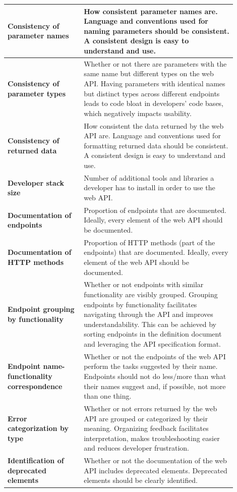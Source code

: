 \documentclass[12pt]{article}
\begin{document}
\begin{center}
{\begin{longtable}{p{0.3\linewidth}p{0.6\linewidth}}
			\hline
			\textbf{Consistency of parameter names} & How consistent parameter names are. Language and conventions used for naming parameters should be consistent. A consistent design is easy to understand and use.\\
			\hline
			\textbf{Consistency of parameter types} & Whether or not there are parameters with the same name but different types on the web API. Having parameters with identical names but distinct types across different endpoints leads to code bloat in developers' code bases, which negatively impacts usability.\\
			\hline
			\textbf{Consistency of returned data} & How consistent the data returned by the web API are. Language and conventions used for formatting returned data should be consistent. A consistent design is easy to understand and use.\\
			\hline
			\textbf{Developer stack size} & Number of additional tools and libraries a developer has to install in order to use the web API.\\
			\hline
			\textbf{Documentation of endpoints} & Proportion of endpoints that are documented. Ideally, every element of the web API should be documented.\\
			\hline
			\textbf{Documentation of HTTP methods} & Proportion of HTTP methods (part of the endpoints) that are documented. Ideally, every element of the web API should be documented.\\
			\hline
			\textbf{Endpoint grouping by functionality} & Whether or not endpoints with similar functionality are visibly grouped. Grouping endpoints by functionality facilitates navigating through the API and improves understandability. This can be achieved by sorting endpoints in the definition document and leveraging the API specification format.\\
			\hline
			\textbf{Endpoint name-functionality correspondence} & Whether or not the endpoints of the web API perform the tasks suggested by their name. Endpoints should not do less/more than what their names suggest and, if possible, not more than one thing.\\
			\hline
			\textbf{Error categorization by type} & Whether or not errors returned by the web API are grouped or categorized by their meaning. Organizing feedback facilitates interpretation, makes troubleshooting easier and reduces developer frustration.\\
			\hline
			\textbf{Identification of deprecated elements} & Whether or not the documentation of the web API includes deprecated elements. Deprecated elements should be clearly identified.\\

\end{longtable}}
\end{center}
\end{document}
